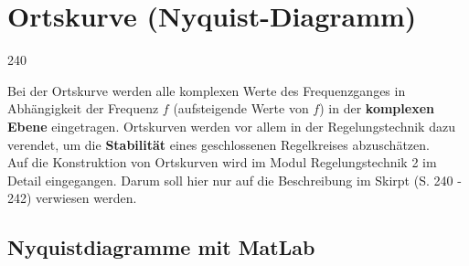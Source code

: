 \section{Ortskurve (Nyquist-Diagramm)}{240}

Bei der Ortskurve werden alle komplexen Werte des Frequenzganges in Abhängigkeit der Frequenz $f$ (aufsteigende Werte von $f$) 
in der \textbf{komplexen Ebene} eingetragen. Ortskurven werden vor allem in der Regelungstechnik dazu verendet, um die 
\textbf{Stabilität} eines geschlossenen Regelkreises abzuschätzen. \\
Auf die Konstruktion von Ortskurven wird im Modul Regelungstechnik 2 im Detail eingegangen. Darum soll hier nur auf die Beschreibung
im Skirpt (S. 240 - 242) verwiesen werden.


\subsection{Nyquistdiagramme mit MatLab}

